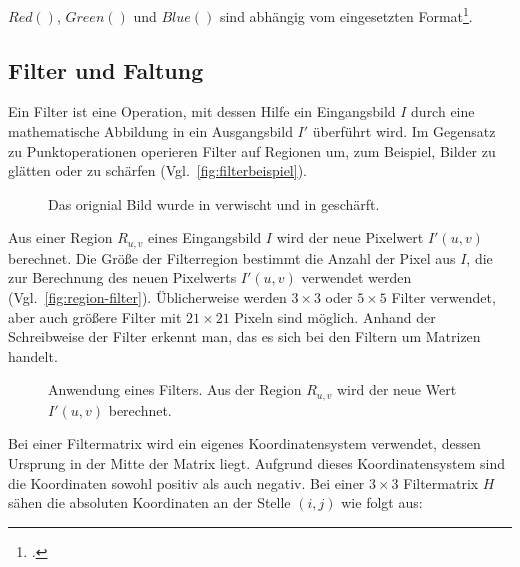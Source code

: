 $Red()$, $Green()$ und $Blue()$ sind abhängig vom eingesetzten Format\footcite[Vgl.][S.~236--237]{burger05}.

\subsection{Filter und Faltung} %
\label{sub:filter}
Ein Filter ist eine Operation, mit dessen Hilfe ein Eingangsbild $I$ durch eine mathematische Abbildung in ein
 Ausgangsbild $I'$ überführt wird. Im Gegensatz zu Punktoperationen operieren Filter auf Regionen um, zum Beispiel,
 Bilder zu glätten oder zu schärfen (Vgl.~\autoref{fig:filterbeispiel}).

\begin{figure}[!ht]
	\centering
	\caption{Das orignial Bild  wurde in
	  verwischt und in  geschärft.}
	\label{fig:filterbeispiel}
\end{figure}

Aus einer Region $R_{u,v}$ eines Eingangsbild $I$ wird der neue Pixelwert $I'(u,v)$ berechnet. Die Größe der
 Filterregion bestimmt die Anzahl der Pixel aus $I$, die zur Berechnung des neuen Pixelwerts $I'(u,v)$ verwendet
 werden (Vgl.~\autoref{fig:region-filter}). Üblicherweise werden $3 \times 3$ oder $5 \times 5$ Filter verwendet, aber
 auch größere Filter mit $21 \times 21$ Pixeln sind möglich. Anhand der Schreibweise der Filter erkennt man, das es
 sich bei den Filtern um Matrizen handelt.

\begin{figure}[!ht]
	\centering
	
	\caption{Anwendung eines Filters. Aus der Region $R_{u,v}$ wird der neue Wert $I'(u,v)$ berechnet.}
	\label{fig:region-filter}
\end{figure}

Bei einer Filtermatrix wird ein eigenes Koordinatensystem verwendet, dessen Ursprung in der Mitte der Matrix liegt.
 Aufgrund dieses Koordinatensystem sind die Koordinaten sowohl positiv als auch negativ. Bei einer $3 \times 3$
 Filtermatrix $H$ sähen die absoluten Koordinaten an der Stelle $(i,j)$ wie folgt aus:

